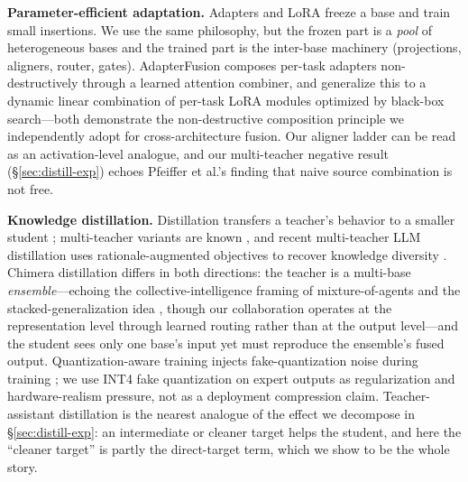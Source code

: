 \documentclass[10pt,twoside]{article}
\theoremstyle{definition}
\theoremstyle{plain}
\theoremstyle{remark}
\begin{document}
\textbf{Parameter-efficient adaptation.} Adapters \citep{houlsby2019} and LoRA \citep{hu2022} freeze a base and train small insertions. We use the same philosophy, but the frozen part is a \emph{pool} of heterogeneous bases and the trained part is the inter-base machinery (projections, aligners, router, gates). AdapterFusion \citep{pfeiffer2021} composes per-task adapters non-destructively through a learned attention combiner, and \citet{huang2024lorahub} generalize this to a dynamic linear combination of per-task LoRA modules optimized by black-box search---both demonstrate the non-destructive composition principle we independently adopt for cross-architecture fusion. Our aligner ladder can be read as an activation-level analogue, and our multi-teacher negative result (\S\ref{sec:distill-exp}) echoes Pfeiffer et al.'s finding that naive source combination is not free.

\textbf{Knowledge distillation.} Distillation transfers a teacher's behavior to a smaller student \citep{hintonDistillingKnowledgeNeural2015,sanh2019,gou2021}; multi-teacher variants are known \citep{you2017}, and recent multi-teacher LLM distillation uses rationale-augmented objectives to recover knowledge diversity \citep{tian2025tinyllm}. Chimera distillation differs in both directions: the teacher is a multi-base \emph{ensemble}---echoing the collective-intelligence framing of mixture-of-agents \citep{wang2024moa} and the stacked-generalization idea \citep{wolpertStackedGeneralization1992}, though our collaboration operates at the representation level through learned routing rather than at the output level---and the student sees only one base's input yet must reproduce the ensemble's fused output. Quantization-aware training injects fake-quantization noise during training \citep{dettmers2022}; we use INT4 fake quantization on expert outputs as regularization and hardware-realism pressure, not as a deployment compression claim. Teacher-assistant distillation \citep{mirzadeh2020} is the nearest analogue of the effect we decompose in \S\ref{sec:distill-exp}: an intermediate or cleaner target helps the student, and here the ``cleaner target'' is partly the direct-target term, which we show to be the whole story.
\end{document}

